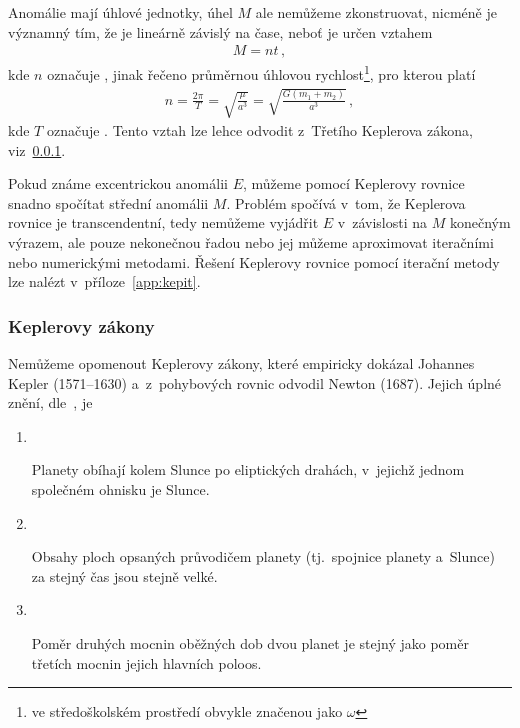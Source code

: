 \documentclass[A4paper, 12pt, oneside]{book}
\begin{document}
Anomálie mají úhlové jednotky, úhel $M$ ale nemůžeme zkonstruovat, nicméně je významný tím, že je lineárně závislý na čase, neboť je určen vztahem 
\begin{align} \label{eq:M}
	M=nt\,,
\end{align}
kde $n$ označuje , jinak řečeno průměrnou úhlovou rychlost\footnote{ve středoškolském prostředí obvykle značenou jako $\omega$}, pro kterou platí
\begin{align} \label{eq:n}
	n=\frac{2\pi}{T}=\sqrt{\frac{\mu}{a^3}}=\sqrt{\frac{G(m_1+m_2)}{a^3}}\,,
\end{align}
kde $T$ označuje . Tento vztah lze lehce odvodit z~Třetího Keplerova zákona, viz~\ref{sec:kepzak}.

Pokud známe excentrickou anomálii $E$, můžeme pomocí Keplerovy rovnice snadno spočítat střední anomálii $M$. Problém spočívá v~tom, že Keplerova rovnice je transcendentní, tedy nemůžeme vyjádřit $E$ v~závislosti na $M$ konečným výrazem, ale pouze nekonečnou řadou nebo jej můžeme aproximovat iteračními nebo numerickými metodami. Řešení Keplerovy rovnice pomocí iterační metody lze nalézt v~příloze~\ref{app:kepit}.

\subsubsection{Keplerovy zákony} \label{sec:kepzak}

Nemůžeme opomenout Keplerovy zákony, které empiricky dokázal Johannes Kepler (1571--1630) a~z~pohybových rovnic odvodil Newton (1687). Jejich úplné znění, dle~\cite{wiki:kepzak}, je 
\begin{enumerate}[wide]
	\item[\textbf{1. Keplerův zákon}] \ 

Planety obíhají kolem Slunce po eliptických drahách, v~jejichž jednom společném ohnisku je Slunce.
	\item[\textbf{2. Keplerův zákon}] \ 

Obsahy ploch opsaných průvodičem planety (tj.\ spojnice planety a~Slunce) za stejný čas jsou stejně velké.
	\item[\textbf{3. Keplerův zákon}] \ 

Poměr druhých mocnin oběžných dob dvou planet je stejný jako poměr třetích mocnin jejich hlavních poloos.
\end{enumerate}
\end{document}
